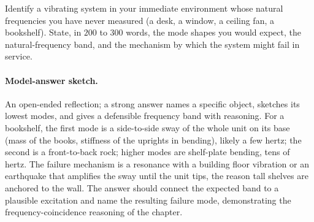 \begin{exercise}
Identify a vibrating system in your immediate environment whose
natural frequencies you have never measured (a desk, a window, a
ceiling fan, a bookshelf). State, in $200$ to $300$ words, the
mode shapes you would expect, the natural-frequency band, and the
mechanism by which the system might fail in service.

\paragraph{Model-answer sketch.} An open-ended reflection; a strong
answer names a specific object, sketches its lowest modes, and gives a
defensible frequency band with reasoning. For a bookshelf, the first
mode is a side-to-side sway of the whole unit on its base (mass of the
books, stiffness of the uprights in bending), likely a few hertz; the
second is a front-to-back rock; higher modes are shelf-plate bending,
tens of hertz. The failure mechanism is a resonance with a building
floor vibration or an earthquake that amplifies the sway until the
unit tips, the reason tall shelves are anchored to the wall. The
answer should connect the expected band to a plausible excitation and
name the resulting failure mode, demonstrating the frequency-coincidence
reasoning of the chapter.
\end{exercise}
